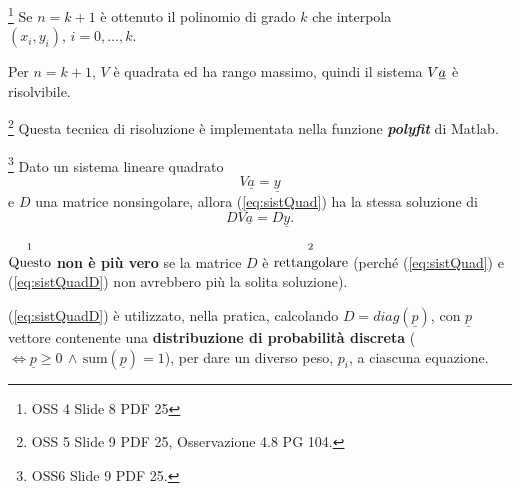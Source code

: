 \begin{remark}
    \footnote{OSS 4 Slide 8 PDF 25}
    Se $\boxed{n=k+1}$ è ottenuto il polinomio di grado $k$ che interpola $(x_i,y_i),\, i=0,\hdots,k$. 
\end{remark}

Per $n=k+1,\, V$ è quadrata ed ha rango massimo, quindi il sistema $V\uline a$ è risolvibile.

\begin{remark}
    \footnote{OSS 5 Slide 9 PDF 25, Osservazione 4.8 PG 104.} Questa tecnica di risoluzione è implementata nella funzione \textit{\textbf{polyfit}} di Matlab.
\end{remark}

\begin{remark}
    \footnote{OSS6 Slide 9 PDF 25.} Dato un sistema lineare quadrato
    \begin{equation}\label{eq:sistQuad}
        V\underline{a}=\underline{y}
    \end{equation}
    e $D$ una matrice nonsingolare, allora (\ref{eq:sistQuad}) ha la stessa soluzione di
    \begin{equation}\label{eq:sistQuadD}
        DV\underline{a}=D\underline{y}.
    \end{equation}
\end{remark}

$\overset{\footnotemark}{\text{Questo}}$ \textbf{non è più vero} se la matrice $D$ è $\overset{\footnotemark}{\text{rettangolare}}$ (perché (\ref{eq:sistQuad}) e (\ref{eq:sistQuadD}) non avrebbero più la solita soluzione). 

(\ref{eq:sistQuadD}) è utilizzato, nella pratica, calcolando $D=diag(\underline{p})$, con $\underline{p}$ vettore contenente una \textbf{distribuzione di probabilità discreta} ($\iff \underline{p}\geq 0 \,\land\, \text{sum}(\underline{p})=1$), per dare un diverso peso, $p_i$, a ciascuna equazione.

\addtocounter{footnote}{-1}


